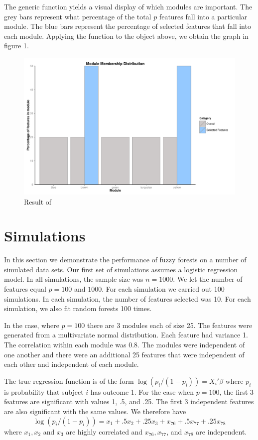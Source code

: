 \documentclass[article,shortnames]{jss}
\begin{document}
The generic function  yields a visual display of which modules are important.  The grey bars
represent what percentage of the total $p$ features fall into a particular module.  The blue bars represent
the percentage of selected features that fall into each module.  Applying the function  to the
object  above, we obtain the graph in figure 1.
\begin{figure}[hc]
\caption{Result of }
\includegraphics{ch3plot}
\end{figure}
\section{Simulations}
In this section we demonstrate the performance of fuzzy forests on a number of simulated data sets.
Our first set of simulations assumes a logistic regression model.  In all simulations, the sample size
was $n=1000$.  We let the number of features equal $p=100$ and $1000$.
For each simulation we carried out 100 simulations.  In each simulation, the number of features selected
was 10.  For each simulation, we also fit random forests 100 times.   

In the case, where $p=100$ there are 3 modules each of size 25.  The features were generated from a multivariate
normal distribution.  Each feature had variance 1.  The correlation within each module was 0.8.  The modules were independent of one 
another and there were an additional 25 features that were independent of each other and independent of each module.  

The true regression function is of the form $\log(p_{i}/(1-p_{i}))=X_{i}'\beta$ where $p_{i}$ is probability that
subject $i$ has outcome 1.   For the case when $p=100$,  the first 3 features are significant with values
1, .5, and .25.  The first 3 independent features are also significant with the same values.  We therefore have
\begin{equation}
\log(p_{i}/(1-p_{i})) = x_{1} + .5x_{2} + .25x_{3} + x_{76} + .5x_{77} + .25x_{78}
\end{equation}
where $x_{1}, x_{2}$ and $x_{3}$ are highly correlated and $ x_{76}, x_{77}$, and $x_{78}$ are independent.
\end{document}
